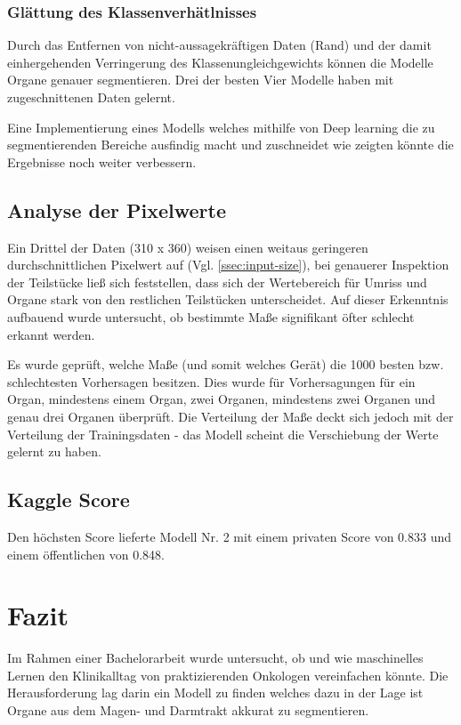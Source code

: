 \subsubsection{Glättung des Klassenverhätlnisses}

Durch das Entfernen von nicht-aussagekräftigen Daten (Rand) und der damit einhergehenden Verringerung des Klassenungleichgewichts können die Modelle Organe genauer segmentieren. Drei der besten Vier Modelle haben mit zugeschnittenen Daten gelernt. 

Eine Implementierung eines Modells welches mithilfe von Deep learning die zu segmentierenden Bereiche ausfindig macht und zuschneidet wie \citet{SmartCrop} zeigten könnte die Ergebnisse noch weiter verbessern.

\subsection{Analyse der Pixelwerte}

Ein Drittel der Daten (310 x 360) weisen einen weitaus geringeren durchschnittlichen Pixelwert auf (Vgl. \ref{ssec:input-size}), bei genauerer Inspektion der Teilstücke ließ sich feststellen, dass sich der Wertebereich für Umriss und Organe stark von den restlichen Teilstücken unterscheidet. Auf dieser Erkenntnis aufbauend wurde untersucht, ob bestimmte Maße signifikant öfter schlecht erkannt werden.

Es wurde geprüft, welche Maße (und somit welches Gerät) die 1000 besten bzw. schlechtesten Vorhersagen besitzen. Dies wurde für Vorhersagungen für ein Organ, mindestens einem Organ, zwei Organen, mindestens zwei Organen und genau drei Organen überprüft. Die Verteilung der Maße deckt sich jedoch mit der Verteilung der Trainingsdaten - das Modell scheint die Verschiebung der Werte gelernt zu haben. 

\subsection{Kaggle Score}

Den höchsten Score lieferte Modell Nr. 2 mit einem privaten Score von 0.833 und einem öffentlichen von 0.848.

\section{Fazit}\raggedbottom

Im Rahmen einer Bachelorarbeit wurde untersucht, ob und wie maschinelles Lernen den Klinikalltag von praktizierenden Onkologen vereinfachen könnte. Die Herausforderung lag darin ein Modell zu finden welches dazu in der Lage ist Organe aus dem Magen- und Darmtrakt akkurat zu segmentieren. 

